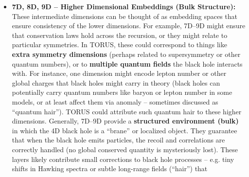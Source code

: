 \documentclass[]{article}
\begin{document}
\begin{itemize}
{  Strings/Membranes):} At 6D and above, TORUS dimensions can encapsulate
  very high-energy or small-scale structures, such as strings or other
  extended objects that quantum gravity might involve. A black hole in
  string theory can be described as a bound state of strings and branes
  -- those live in higher dimensions. So in TORUS, the \textbf{6D level
  might represent the black hole as a string/brane configuration},
  providing a microscopic count of states. The entropy of the black hole
  can, for example, be calculated by counting string states in certain
  string models (as Strominger and Vafa did in 1996 for extremal 5D
  black holes【18†L427-L435】). TORUS would include that idea in the
  recursion: the 2D horizon's bits correspond to 6D string bits in a
  one-to-many mapping. Thus, the 6D recursion contributes to the
  \textbf{microstate count} Ω. Every independent microstate in 6D
  (string/brane arrangement) manifests as a slightly different
  configuration at 2D (horizon degrees) and hence contributes to the
  entropy. This provides a concrete linkage between the area law and
  microscopic states, addressing the entropy problem in a manner similar
  to string theory but within the TORUS unified context.
\item
  \textbf{7D, 8D, 9D -- Higher Dimensional Embeddings (Bulk Structure):}
  These intermediate dimensions can be thought of as embedding spaces
  that ensure consistency of the lower dimensions. For example, 7D--9D
  might ensure that conservation laws hold across the recursion, or they
  might relate to particular symmetries. In TORUS, these could
  correspond to things like \textbf{extra symmetry dimensions} (perhaps
  related to supersymmetry or other quantum numbers), or to
  \textbf{multiple quantum fields} the black hole interacts with. For
  instance, one dimension might encode lepton number or other global
  charges that black holes might carry in theory (black holes can
  potentially carry quantum numbers like baryon or lepton number in some
  models, or at least affect them via anomaly -- sometimes discussed as
  ``quantum hair''). TORUS could attribute such quantum hair to these
  higher dimensions. Generally, 7D--9D provide a \textbf{structured
  environment (bulk)} in which the 4D black hole is a ``brane'' or
  localized object. They guarantee that when the black hole emits
  particles, the recoil and correlations are correctly handled (no
  global conserved quantity is mysteriously lost). These layers likely
  contribute small corrections to black hole processes -- e.g. tiny
  shifts in Hawking spectra or subtle long-range fields (``hair'') that

\end{itemize}
\end{document}
